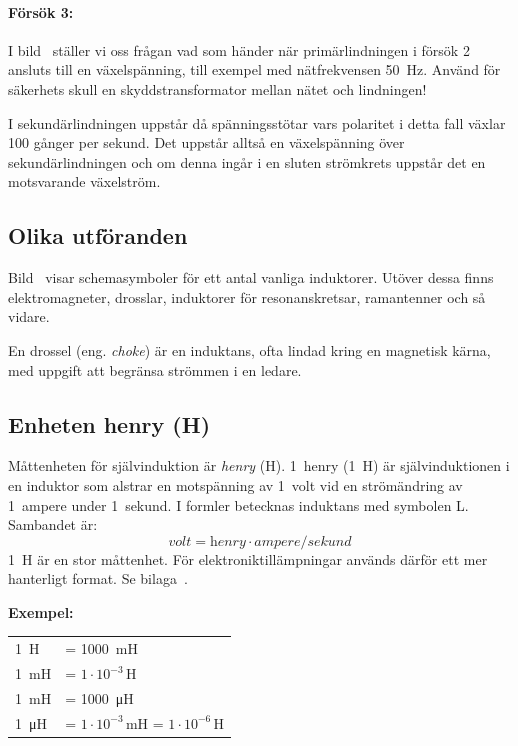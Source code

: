 \paragraph{Försök 3:}
I bild~ ställer vi oss frågan vad som händer när
primärlindningen i försök 2 ansluts till en växelspänning, till exempel
med nätfrekvensen \qty{50}{\hertz}.
Använd för säkerhets skull en skyddstransformator mellan nätet och lindningen!

I sekundärlindningen uppstår då spänningsstötar vars polaritet i detta fall
växlar 100 gånger per sekund.
Det uppstår alltså en växelspänning över sekundärlindningen och om denna ingår i
en sluten strömkrets uppstår det en motsvarande växelström.


\subsection{Olika utföranden}

Bild~ visar schemasymboler för ett antal vanliga induktorer.
Utöver dessa finns elektromagneter, drosslar, induktorer för resonanskretsar,
ramantenner och så vidare.

En drossel (eng. \emph{choke}) är en induktans, ofta lindad kring en magnetisk
kärna, med uppgift att begränsa strömmen i en ledare.

\subsection{Enheten henry (H)}
\label{enheten_henry}

Måttenheten för självinduktion är \emph{henry} (\unit{\henry}).
1~henry (\qty{1}{\henry}) är självinduktionen i en induktor som alstrar en
motspänning av 1~volt vid en strömändring av 1~ampere under 1~sekund.
I formler betecknas induktans med symbolen L.
Sambandet är:
\[\textit{volt} = \textit{henry} \cdot \textit{ampere}/\textit{sekund}\]
\qty{1}{\henry} är en stor måttenhet.
För elektroniktillämpningar används därför ett mer hanterligt format.
Se bilaga~.

\noindent\textbf{Exempel:}

\begin{center}
\begin{tabular}{ll}
\qty{1}{\henry} & = \qty{1000}{\milli\henry} \\
\qty{1}{\milli\henry} & = \(1 \cdot 10^{-3}\)\,H \\
\qty{1}{\milli\henry} & = \qty{1000}{\micro\henry} \\
\qty{1}{\micro\henry} & = \(1 \cdot 10^{-3}\)\,mH = \(1 \cdot 10^{-6}\)\,H
\end{tabular}
\end{center}

